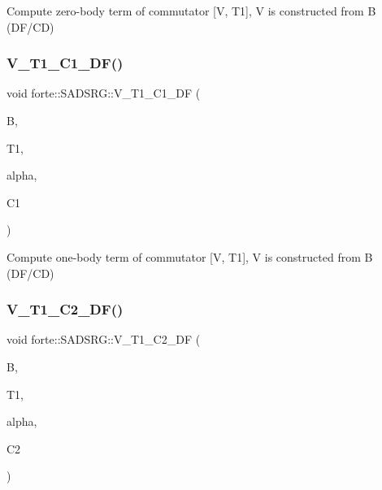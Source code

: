 Compute zero-\/body term of commutator \mbox{[}V, T1\mbox{]}, V is constructed from B (D\+F/\+CD) 

\mbox{\label{classforte_1_1_s_a_d_s_r_g_ae3f5925bdf9da1da392d3cab1230767f}} 
\subsubsection{\texorpdfstring{V\+\_\+\+T1\+\_\+\+C1\+\_\+\+D\+F()}{V\_T1\_C1\_DF()}}
{\footnotesize\ttfamily void forte\+::\+S\+A\+D\+S\+R\+G\+::\+V\+\_\+\+T1\+\_\+\+C1\+\_\+\+DF (\begin{DoxyParamCaption}\item[{Blocked\+Tensor \&}]{B,  }\item[{Blocked\+Tensor \&}]{T1,  }\item[{const double \&}]{alpha,  }\item[{Blocked\+Tensor \&}]{C1 }\end{DoxyParamCaption})\hspace{0.3cm}{\ttfamily [protected]}}



Compute one-\/body term of commutator \mbox{[}V, T1\mbox{]}, V is constructed from B (D\+F/\+CD) 

\mbox{\label{classforte_1_1_s_a_d_s_r_g_a9498f1d6439fa990e7cd018c7439526b}} 
\subsubsection{\texorpdfstring{V\+\_\+\+T1\+\_\+\+C2\+\_\+\+D\+F()}{V\_T1\_C2\_DF()}}
{\footnotesize\ttfamily void forte\+::\+S\+A\+D\+S\+R\+G\+::\+V\+\_\+\+T1\+\_\+\+C2\+\_\+\+DF (\begin{DoxyParamCaption}\item[{Blocked\+Tensor \&}]{B,  }\item[{Blocked\+Tensor \&}]{T1,  }\item[{const double \&}]{alpha,  }\item[{Blocked\+Tensor \&}]{C2 }\end{DoxyParamCaption})\hspace{0.3cm}{\ttfamily [protected]}}



